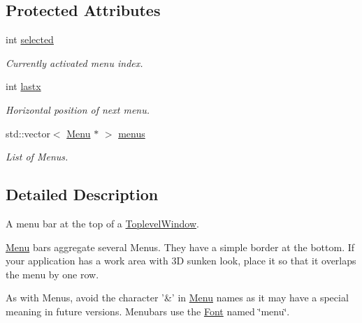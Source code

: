 \subsection*{Protected Attributes}
\begin{DoxyCompactItemize}
\item 
\hypertarget{classGUI_1_1Menubar_a7ba2bbc755e9fbe3b584b02256b3b2c0}{int \hyperlink{classGUI_1_1Menubar_a7ba2bbc755e9fbe3b584b02256b3b2c0}{selected}}\label{classGUI_1_1Menubar_a7ba2bbc755e9fbe3b584b02256b3b2c0}

\begin{DoxyCompactList}\small\item\em Currently activated menu index. \end{DoxyCompactList}\item 
\hypertarget{classGUI_1_1Menubar_a84f8ff67ee746256b723141753963945}{int \hyperlink{classGUI_1_1Menubar_a84f8ff67ee746256b723141753963945}{lastx}}\label{classGUI_1_1Menubar_a84f8ff67ee746256b723141753963945}

\begin{DoxyCompactList}\small\item\em Horizontal position of next menu. \end{DoxyCompactList}\item 
\hypertarget{classGUI_1_1Menubar_a64e2ac8f37055d1af4d186982acd8945}{std\-::vector$<$ \hyperlink{classGUI_1_1Menu}{Menu} $\ast$ $>$ \hyperlink{classGUI_1_1Menubar_a64e2ac8f37055d1af4d186982acd8945}{menus}}\label{classGUI_1_1Menubar_a64e2ac8f37055d1af4d186982acd8945}

\begin{DoxyCompactList}\small\item\em List of Menus. \end{DoxyCompactList}\end{DoxyCompactItemize}


\subsection{Detailed Description}
A menu bar at the top of a \hyperlink{classGUI_1_1ToplevelWindow}{Toplevel\-Window}. 

\hyperlink{classGUI_1_1Menu}{Menu} bars aggregate several Menus. They have a simple border at the bottom. If your application has a work area with 3\-D sunken look, place it so that it overlaps the menu by one row.

As with Menus, avoid the character {\ttfamily '\&'} in \hyperlink{classGUI_1_1Menu}{Menu} names as it may have a special meaning in future versions. Menubars use the \hyperlink{classGUI_1_1Font}{Font} named \char`\"{}menu\char`\"{}. 

